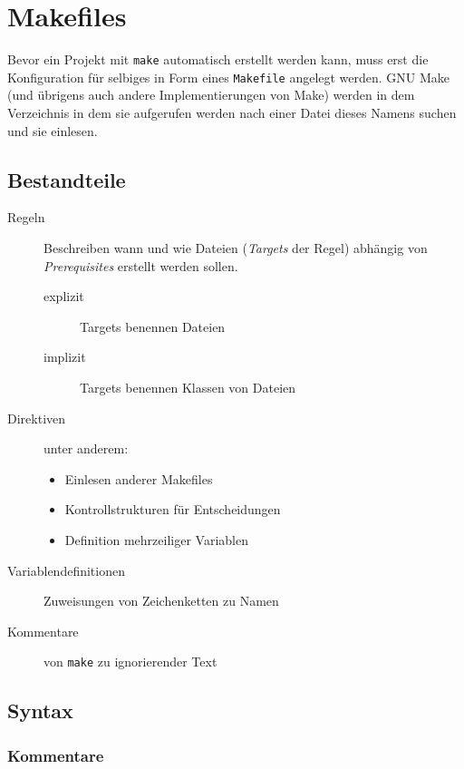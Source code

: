 \section{Makefiles}

Bevor ein Projekt mit \texttt{make} automatisch erstellt werden kann, muss erst
die Konfiguration für selbiges in Form eines \texttt{Makefile} angelegt werden.
GNU Make (und übrigens auch andere Implementierungen von Make) werden in dem
Verzeichnis in dem sie aufgerufen werden nach einer Datei dieses Namens suchen
und sie einlesen.

\subsection{Bestandteile}

\begin{description}
%
	\item[Regeln] Beschreiben wann und wie Dateien (\emph{Targets} der Regel)
	abhängig von \emph{Prerequisites} erstellt werden sollen.
	\begin{description}
		\item[explizit] Targets benennen Dateien
		\item[implizit] Targets benennen Klassen von Dateien
	\end{description}
%
	\item[Direktiven] unter anderem:
	\begin{itemize}
		\item Einlesen anderer Makefiles
		\item Kontrollstrukturen für Entscheidungen
		\item Definition mehrzeiliger Variablen
	\end{itemize}
%
	\item[Variablendefinitionen] Zuweisungen von Zeichenketten zu Namen
%
	\item[Kommentare] von \texttt{make} zu ignorierender Text
\end{description}

\subsection{Syntax}

\subsubsection*{Kommentare}  
	
